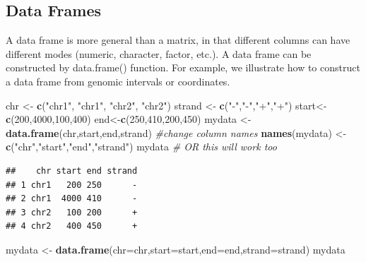 \documentclass[12pt,]{krantz}
\newenvironment{Shaded}{\begin{snugshade}}{\end{snugshade}}
\newcommand{\CommentTok}[1]{\textcolor[rgb]{0.56,0.35,0.01}{\textit{#1}}}
\newcommand{\DataTypeTok}[1]{\textcolor[rgb]{0.13,0.29,0.53}{#1}}
\newcommand{\DecValTok}[1]{\textcolor[rgb]{0.00,0.00,0.81}{#1}}
\newcommand{\KeywordTok}[1]{\textcolor[rgb]{0.13,0.29,0.53}{\textbf{#1}}}
\newcommand{\NormalTok}[1]{#1}
\newcommand{\StringTok}[1]{\textcolor[rgb]{0.31,0.60,0.02}{#1}}
\begin{document}
\hypertarget{data-frames}{%
\subsection{Data Frames}\label{data-frames}}

A data frame is more general than a matrix, in that different columns can have different modes (numeric, character, factor, etc.). A data frame can be constructed by data.frame() function. For example, we illustrate how to construct a data frame from genomic intervals or coordinates.

\begin{Shaded}
\begin{Highlighting}[]
\NormalTok{chr <-}\StringTok{ }\KeywordTok{c}\NormalTok{(}\StringTok{"chr1"}\NormalTok{, }\StringTok{"chr1"}\NormalTok{, }\StringTok{"chr2"}\NormalTok{, }\StringTok{"chr2"}\NormalTok{)}
\NormalTok{strand <-}\StringTok{ }\KeywordTok{c}\NormalTok{(}\StringTok{"-"}\NormalTok{,}\StringTok{"-"}\NormalTok{,}\StringTok{"+"}\NormalTok{,}\StringTok{"+"}\NormalTok{)}
\NormalTok{start<-}\StringTok{ }\KeywordTok{c}\NormalTok{(}\DecValTok{200}\NormalTok{,}\DecValTok{4000}\NormalTok{,}\DecValTok{100}\NormalTok{,}\DecValTok{400}\NormalTok{)}
\NormalTok{end<-}\KeywordTok{c}\NormalTok{(}\DecValTok{250}\NormalTok{,}\DecValTok{410}\NormalTok{,}\DecValTok{200}\NormalTok{,}\DecValTok{450}\NormalTok{)}
\NormalTok{mydata <-}\StringTok{ }\KeywordTok{data.frame}\NormalTok{(chr,start,end,strand)}
\CommentTok{#change column names}
\KeywordTok{names}\NormalTok{(mydata) <-}\StringTok{ }\KeywordTok{c}\NormalTok{(}\StringTok{"chr"}\NormalTok{,}\StringTok{"start"}\NormalTok{,}\StringTok{"end"}\NormalTok{,}\StringTok{"strand"}\NormalTok{)}
\NormalTok{mydata }\CommentTok{# OR this will work too}
\end{Highlighting}
\end{Shaded}

\begin{verbatim}
##    chr start end strand
## 1 chr1   200 250      -
## 2 chr1  4000 410      -
## 3 chr2   100 200      +
## 4 chr2   400 450      +
\end{verbatim}

\begin{Shaded}
\begin{Highlighting}[]
\NormalTok{mydata <-}\StringTok{ }\KeywordTok{data.frame}\NormalTok{(}\DataTypeTok{chr=}\NormalTok{chr,}\DataTypeTok{start=}\NormalTok{start,}\DataTypeTok{end=}\NormalTok{end,}\DataTypeTok{strand=}\NormalTok{strand)}
\NormalTok{mydata}
\end{Highlighting}
\end{Shaded}
\end{document}

